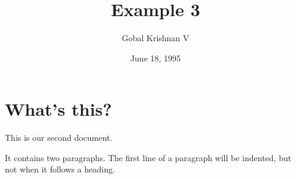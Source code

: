 \documentclass[a4paper,11pt]{article}
\begin{document}
\title{Example 3}
\author{Gobal Krishnan V}
\date{June 18, 1995}
\maketitle
\section{What's this?}
This is our 
second document.

It contains two paragraphs. The first line of a paragraph will be indented, but not when it follows a heading.
\end{document}
